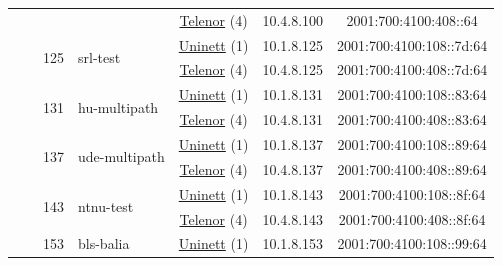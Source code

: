 \begin{small}
\begin{center}
\begin{longtable}{|c|c|c|c|c|c|c|c|}
  &  & \multicolumn{2}{|c|}{} & \multicolumn{2}{|c|}{\tiny{\href{https://www.telenor.no}{Telenor} (4)}} & \tiny{10.4.8.100} & \tiny{2001:700:4100:408::64} \\* \cline{3-3}\cline{4-4}\cline{5-5}\cline{6-6}\cline{7-7}\cline{8-8}
  &  & \multirow{2}{*}{\tiny{125}} & \multicolumn{1}{|l|}{\multirow{2}{*}{\tiny{srl-test}}} & \multicolumn{2}{|c|}{\tiny{\href{https://www.uninett.no}{Uninett} (1)}} & \tiny{10.1.8.125} & \tiny{2001:700:4100:108::7d:64} \\* \cline{5-5}\cline{6-6}\cline{7-7}\cline{8-8}
  &  &  &  & \multicolumn{2}{|c|}{\tiny{\href{https://www.telenor.no}{Telenor} (4)}} & \tiny{10.4.8.125} & \tiny{2001:700:4100:408::7d:64} \\* \cline{3-3}\cline{4-4}\cline{5-5}\cline{6-6}\cline{7-7}\cline{8-8}
  &  & \multirow{2}{*}{\tiny{131}} & \multicolumn{1}{|l|}{\multirow{2}{*}{\tiny{hu-multipath}}} & \multicolumn{2}{|c|}{\tiny{\href{https://www.uninett.no}{Uninett} (1)}} & \tiny{10.1.8.131} & \tiny{2001:700:4100:108::83:64} \\* \cline{5-5}\cline{6-6}\cline{7-7}\cline{8-8}
  &  &  &  & \multicolumn{2}{|c|}{\tiny{\href{https://www.telenor.no}{Telenor} (4)}} & \tiny{10.4.8.131} & \tiny{2001:700:4100:408::83:64} \\* \cline{3-3}\cline{4-4}\cline{5-5}\cline{6-6}\cline{7-7}\cline{8-8}
  &  & \multirow{2}{*}{\tiny{137}} & \multicolumn{1}{|l|}{\multirow{2}{*}{\tiny{ude-multipath}}} & \multicolumn{2}{|c|}{\tiny{\href{https://www.uninett.no}{Uninett} (1)}} & \tiny{10.1.8.137} & \tiny{2001:700:4100:108::89:64} \\* \cline{5-5}\cline{6-6}\cline{7-7}\cline{8-8}
  &  &  &  & \multicolumn{2}{|c|}{\tiny{\href{https://www.telenor.no}{Telenor} (4)}} & \tiny{10.4.8.137} & \tiny{2001:700:4100:408::89:64} \\* \cline{3-3}\cline{4-4}\cline{5-5}\cline{6-6}\cline{7-7}\cline{8-8}
  &  & \multirow{2}{*}{\tiny{143}} & \multicolumn{1}{|l|}{\multirow{2}{*}{\tiny{ntnu-test}}} & \multicolumn{2}{|c|}{\tiny{\href{https://www.uninett.no}{Uninett} (1)}} & \tiny{10.1.8.143} & \tiny{2001:700:4100:108::8f:64} \\* \cline{5-5}\cline{6-6}\cline{7-7}\cline{8-8}
  &  &  &  & \multicolumn{2}{|c|}{\tiny{\href{https://www.telenor.no}{Telenor} (4)}} & \tiny{10.4.8.143} & \tiny{2001:700:4100:408::8f:64} \\* \cline{3-3}\cline{4-4}\cline{5-5}\cline{6-6}\cline{7-7}\cline{8-8}
  &  & \multirow{2}{*}{\tiny{153}} & \multicolumn{1}{|l|}{\multirow{2}{*}{\tiny{bls-balia}}} & \multicolumn{2}{|c|}{\tiny{\href{https://www.uninett.no}{Uninett} (1)}} & \tiny{10.1.8.153} & \tiny{2001:700:4100:108::99:64} \\* \cline{5-5}\cline{6-6}\cline{7-7}\cline{8-8}

\end{longtable}
\end{center}
\end{small}
